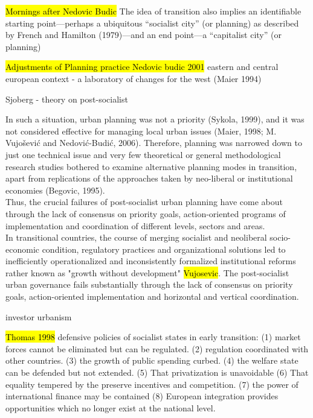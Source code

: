 \documentclass[11pt]{report}
\begin{document}
\hl{Mornings after Nedovic Budic}
The idea of transition also implies an identiﬁable starting point—perhaps a ubiquitous “socialist city” (or planning) as described by French and Hamilton (1979)—and an end point—a “capitalist city” (or planning)

\hl{Adjustments of Planning practice Nedovic budic 2001}
eastern and central european context - a laboratory of changes for the west (Maier 1994)

Sjoberg - theory on post-socialist

In such a situation, urban planning was not a priority (Sykola, 1999), and it was not considered effective for managing local urban issues (Maier, 1998; M. Vujošević and Nedović-Budić, 2006). Therefore, planning was narrowed down to just one technical issue and very few theoretical or general methodological research studies bothered to examine alternative planning modes in transition, apart from replications of the approaches taken by neo-liberal or institutional economies (Begovic, 1995).
\\
Thus, the crucial failures of post-socialist urban planning have come about through the lack of consensus on priority goals, action-oriented programs of implementation and coordination of different levels, sectors and areas. 
\\
In transitional countries, the course of merging socialist and neoliberal socio-economic condition, regulatory practices and organizational solutions led to inefficiently operationalized and inconsistently formalized institutional reforms rather known as "growth without development" \hl{Vujosevic}.
The post-socialist urban governance fails substantially through the lack of consensus on priority goals, action-oriented implementation and horizontal and vertical coordination.
\\

investor urbanism

\hl{Thomas 1998}
defensive policies of socialist states in early transition:
(1) market  forces  cannot  be  eliminated  but  can  be  regulated.
(2) regulation coordinated  with  other  countries.
(3) the growth  of public  spending curbed.
(4) the welfare  state can be defended  but  not  extended.
(5)  That  privatization  is  unavoidable
(6)  That  equality tempered  by  the  preserve incentives  and  competition.
(7) the  power  of  international  finance  may  be  contained
(8) European  integration  provides  opportunities  which  no longer  exist  at the national  level.
\end{document}
